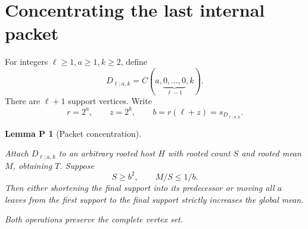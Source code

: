 \documentclass[11pt,reqno]{amsart}
\theoremstyle{plain}
\newtheorem*{packetlemma}{Lemma P}
\begin{document}
\section{Concentrating the last internal packet}\label{concentrating-the-last-internal-packet}

For integers \(\ell\ge1,a\ge1,k\ge2\), define \[
D_{\ell;a,k}=C(a,\underbrace{0,\ldots,0}_{\ell-1},k).
\] There are \(\ell+1\) support vertices. Write \[
r=2^a,\qquad z=2^k,\qquad b=r(\ell+z)=s_{D_{\ell;a,k}}.
\]

\begin{packetlemma}[Packet concentration]\label{lem:packet}

Attach \(D_{\ell;a,k}\) to an arbitrary rooted host \(H\) with rooted count \(S\) and rooted mean \(M\), obtaining \(T\). Suppose \[
S\ge b^2,\qquad M/S\le1/b.
\tag{3.1}\label{eq:main-3-1}
\] Then either shortening the final support into its predecessor or moving all \(a\) leaves from the first support to the final support strictly increases the global mean.

Both operations preserve the complete vertex set.

\end{packetlemma}
\end{document}
